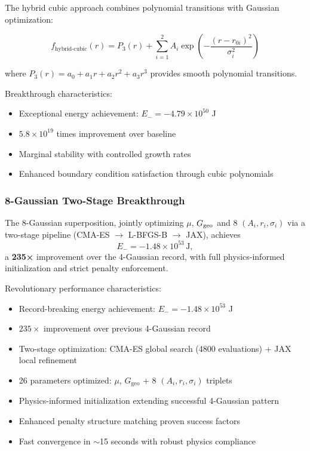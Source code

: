 \documentclass[12pt,a4paper]{article}
\begin{document}
The hybrid cubic approach combines polynomial transitions with Gaussian optimization:

\begin{equation}
f_{\text{hybrid-cubic}}(r) = P_3(r) + \sum_{i=1}^{2} A_i \exp\left(-\frac{(r - r_{0i})^2}{\sigma_i^2}\right)
\end{equation}

where $P_3(r) = a_0 + a_1 r + a_2 r^2 + a_3 r^3$ provides smooth polynomial transitions.

Breakthrough characteristics:
\begin{itemize}
\item Exceptional energy achievement: $E_- = -4.79 \times 10^{50}$ J
\item $5.8 \times 10^{19}$ times improvement over baseline
\item Marginal stability with controlled growth rates
\item Enhanced boundary condition satisfaction through cubic polynomials
\end{itemize}

\subsubsection{8-Gaussian Two-Stage Breakthrough}

The 8-Gaussian superposition, jointly optimizing $\mu$, $G_{\rm geo}$ and 8 $(A_i,r_i,\sigma_i)$ via a two-stage pipeline (CMA-ES $\rightarrow$ L-BFGS-B $\rightarrow$ JAX), achieves
\[
  E_- = -1.48\times10^{53}\,\mathrm{J},
\]
a \textbf{235×} improvement over the 4-Gaussian record, with full physics-informed initialization and strict penalty enforcement.

Revolutionary performance characteristics:
\begin{itemize}
\item Record-breaking energy achievement: $E_- = -1.48 \times 10^{53}$ J  
\item $235\times$ improvement over previous 4-Gaussian record
\item Two-stage optimization: CMA-ES global search (4800 evaluations) + JAX local refinement
\item 26 parameters optimized: $\mu$, $G_{\text{geo}}$ + 8 $(A_i, r_i, \sigma_i)$ triplets
\item Physics-informed initialization extending successful 4-Gaussian pattern
\item Enhanced penalty structure matching proven success factors
\item Fast convergence in $\sim$15 seconds with robust physics compliance
\end{itemize}
\end{document}
